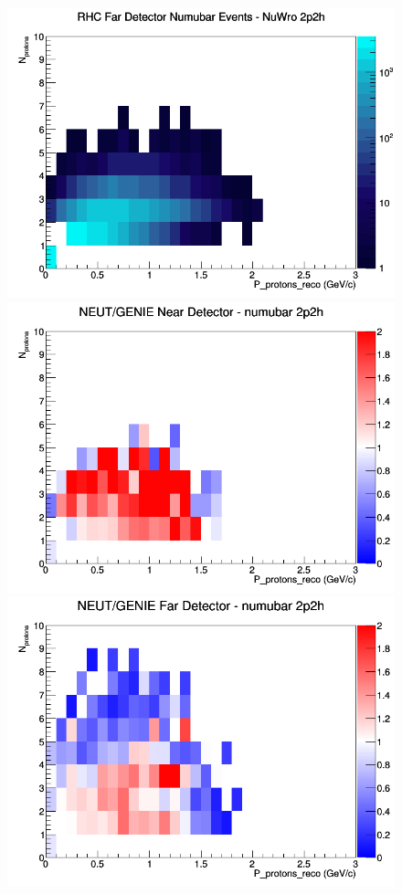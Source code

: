 \documentclass[12pt]{article}
\begin{document}
\begin{figure}[h]
\endminipage
{}
\includegraphics[width=\linewidth]{eff_N_P/FGT/protons/2p2h_RHC_FD_numubar_N_P_NuWro.png}
\endminipage
\newline
{}
\includegraphics[width=\linewidth]{eff_N_P/FGT/protons/ratios/2p2h_NEUT_GENIE_numubar_near_N_P.png}
\endminipage
{}
\includegraphics[width=\linewidth]{eff_N_P/FGT/protons/ratios/2p2h_NEUT_GENIE_numubar_far_N_P.png}

\end{figure}
\end{document}
